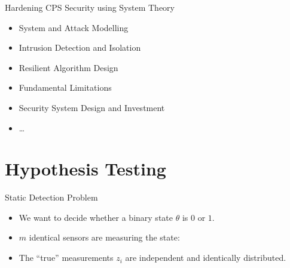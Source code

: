 \documentclass[10pt]{beamer}
\newlength\figureheight
\newlength\figurewidth
\newcommand{\tikzdir}[1]{#1.tikz}
\newcommand{\inputtikz}[1]{}}
\begin{document}
%

\begin{frame}{Hardening CPS Security using System Theory}
  \begin{itemize}
  \item System and Attack Modelling
  \item Intrusion Detection and Isolation
  \item Resilient Algorithm Design
  \item Fundamental Limitations
  \item Security System Design and Investment
  \item \dots
  \end{itemize}
\end{frame}

\section{Hypothesis Testing}

\begin{frame}{Static Detection Problem}
  \begin{itemize}
    \item We want to decide whether a binary state $\theta$ is $0$ or $1$.
    \item $m$ identical sensors are measuring the state: 
      \begin{center}
	\setlength{\figureheight}{3cm}
	\setlength{\figurewidth}{10cm}
	\inputtikz{gaussian}
      \end{center}
    \item The ``true'' measurements $z_i$ are independent and identically distributed.
  \end{itemize}
\end{frame}
\end{document}
